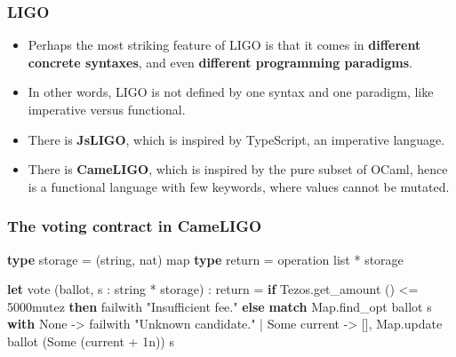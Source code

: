 \documentclass[compress,dvips,xcolor={dvipsnames},t]{beamer}
\begin{document}
\begin{frame}
  \frametitle{LIGO}

  \begin{itemize}

    \item Perhaps the most striking feature of LIGO is that it comes
      in \textbf{different concrete syntaxes}, and even
      \textbf{different programming paradigms}.

    \item In other words, LIGO is not defined by one syntax and one
      paradigm, like imperative versus functional.

    \item There is \textbf{JsLIGO}, which is inspired by TypeScript,
      an imperative language.

    \item There is \textbf{CameLIGO}, which is inspired by the pure
      subset of OCaml, hence is a functional language with few
      keywords, where values cannot be mutated.

  \end{itemize}

\end{frame}

\begin{frame}[containsverbatim]
  \frametitle{The voting contract in CameLIGO}

  \begin{semiverbatim}
\textbf{type} storage = (string, nat) map
\textbf{type} return = operation list * storage

\textbf{let} vote (ballot, s : string * storage) : return =
  \textbf{if}   Tezos.get_amount () <= 5000mutez
  \textbf{then} failwith "Insufficient fee."
  \textbf{else}
    \textbf{match} Map.find\_opt ballot s \textbf{with}
      None -> failwith "Unknown candidate."
    | Some current ->
        [], Map.update ballot (Some (current + 1n)) s
  \end{semiverbatim}

\end{frame}
\end{document}
